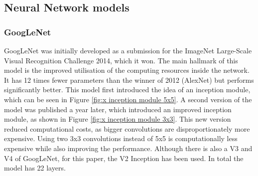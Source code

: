 \documentclass[conference]{IEEEtran}
\begin{document}
\subsection{Neural Network models}
\subsubsection{GoogLeNet}
GoogLeNet was initially developed as a submission for the ImageNet Large-Scale Visual Recognition Challenge 2014, which it won. 
The main hallmark of this model is the improved utilisation of the computing resources inside the network. 
It has 12 times fewer parameters than the winner of 2012 (AlexNet) but performs significantly better. \cite{szegedy_going_2014}
This model first introduced the idea of an inception module, which can be seen in Figure \ref{fig:x inception module 5x5}.
A second version of the model was published a year later, which introduced an improved inception module, as shown in Figure \ref{fig:x inception module 3x3}.
This new version reduced computational costs, as bigger convolutions are disproportionately more expensive. Using two 3x3 convolutions instead of 5x5 is computationally less expensive while also improving the performance.
Although there is also a V3 and V4 of GoogLeNet, for this paper, the V2 Inception has been used.
In total the model has 22 layers.
\end{document}
